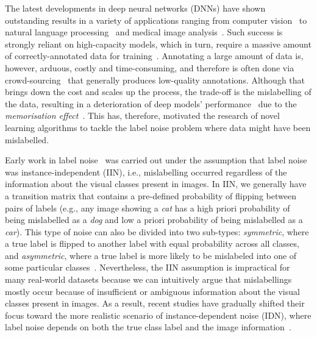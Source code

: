 \documentclass[10pt,twocolumn,letterpaper]{article}
\begin{document}
    The latest developments in deep neural networks (DNNs) have shown outstanding results in a variety of applications ranging from computer vision~\cite{krizhevsky2012imagenet} to natural language processing~\cite{ragesh2021hetegcn} and medical image analysis~\cite{qian20223d}. Such success is strongly reliant on high-capacity models, which in turn, require a massive amount of correctly-annotated data for training~\cite{yao2020dual, litjens2017survey}. Annotating a large amount of data is, however, arduous, costly and time-consuming, and therefore is often done via crowd-sourcing~\cite{song2022learning} that generally produces low-quality annotations. Although that brings down the cost and scales up the process, the trade-off is the mislabelling of the data, resulting in a deterioration of deep models' performance~\cite{liu2020early, bae2022noisy} due to the \emph{memorisation effect}~\cite{neyshabur2017exploring, arpit2017closer, liu2020early, zhang2021learning_}. This has, therefore, motivated the research of novel learning algorithms to tackle the label noise problem where data might have been mislabelled.
    


Early work in label noise~\cite{han2018co} was carried out under the assumption that label noise was instance-independent (IIN), i.e., mislabelling occurred regardless of the information about the visual classes present in images.
    In IIN, we generally have a transition matrix that contains a pre-defined probability of flipping between pairs of labels (e.g., any image showing a \emph{cat} has a high priori probability of being mislabelled as a \emph{dog} and low a priori probability of being mislabelled as a \emph{car}).
This type of noise can also be divided into two sub-types: \emph{symmetric}, where a true label is flipped to another label with equal probability across all classes, and \emph{asymmetric}, where a true label is more likely to be mislabeled into one of some particular classes~\cite{han2018co}. 
    Nevertheless, the IIN assumption is impractical for many real-world datasets because we can intuitively argue that mislabellings mostly occur because of insufficient or ambiguous information  about the visual classes present in images. 
    As a result, recent studies have gradually shifted their focus toward the more realistic scenario of instance-dependent noise (IDN), where label noise depends on both the true class label and the image information~\cite{xia2020part}.
    
\end{document}
